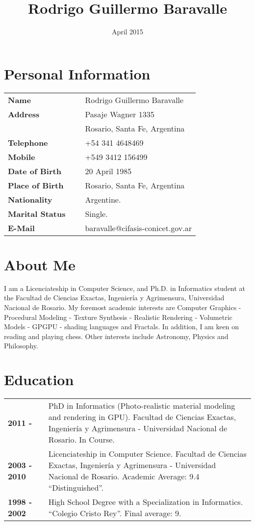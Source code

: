 \documentclass[a4paper,12pt]{article}
\title{Rodrigo Guillermo Baravalle}
\date{April 2015}
\begin{document}
\maketitle
\section*{Personal Information}

\begin{tabular}{lcl}
\bf{Name} & & Rodrigo Guillermo Baravalle\\
\bf{Address} & & Pasaje Wagner 1335\\ &\ & Rosario, Santa Fe, Argentina\\
\bf{Telephone}& &+54 341 4648469\\
\bf{Mobile} & & +549 3412 156499 \\
\bf{Date of Birth} & & 20 April 1985\\
\bf{Place of Birth} & & Rosario, Santa Fe, Argentina\\
\bf{Nationality} & & Argentine.\\
\bf{Marital Status} & & Single.\\
\bf{E-Mail}& &baravalle@cifasis-conicet.gov.ar\\
\end{tabular}

\section*{About Me}
\begin{small}
\noindent
I am a Licenciateship in Computer Science, and Ph.D. in Informatics student at the Facultad de Ciencias Exactas, Ingenier\'ia y Agrimensura, Universidad Nacional de Rosario.
My foremost academic interests are Computer Graphics - Procedural Modeling - Texture Synthesis - Realistic Rendering - Volumetric Models - GPGPU - shading languages and Fractals. 
In addition, I am keen on reading and playing chess.
Other interests include Astronomy, Physics and Philosophy.
\end{small}


\section*{Education}

\begin{tabular}{lcp{9 cm}}
		\bf{2011 - } & & PhD in Informatics (Photo-realistic material modeling and rendering in GPU). Facultad de Ciencias Exactas, Ingenier\'ia y Agrimensura - Universidad Nacional de Rosario. In Course.\\
		\bf{2003 - 2010} & & Licenciateship in Computer Science. Facultad de Ciencias Exactas, Ingenier\'ia y Agrimensura - Universidad Nacional de Rosario. Academic Average: 9.4 ``Distinguished''.\\
		\bf{1998 - 2002} & & High School Degree with a Specialization in Informatics. ``Colegio Cristo Rey''. Final average: 9.\\
\end{tabular}
\end{document}
